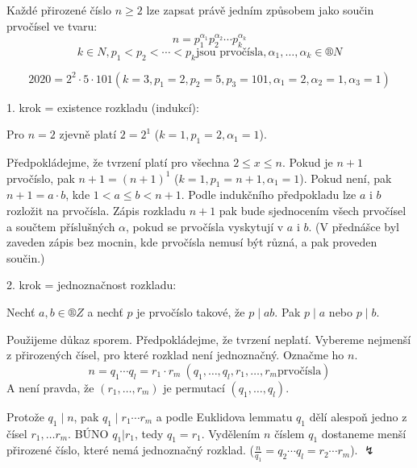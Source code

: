 \documentclass[12pt]{article}					%
\begin{document}
    \begin{veta}
        Každé přirozené číslo $n≥2$ lze zapsat právě jedním způsobem jako součin prvočísel ve tvaru:
        $$ n = p_1^{\alpha_1}p_2^{\alpha_2}\cdots p_k^{\alpha_k} $$ 
        $$ k \in N, p_1<p_2<\cdots<p_k \text{jsou prvočísla}, \alpha_1,…,\alpha_k \in ®N$$
        \begin{prikladyin}
                $$ 2020 = 2^2 \cdot 5 \cdot 101 (k = 3, p_1 = 2, p_2 = 5, p_3 = 101, \alpha_1 = 2, \alpha_2 = 1, \alpha_3 = 1) $$ 
        \end{prikladyin}
        \begin{dukazin}
            1. krok = existence rozkladu (indukcí):
            
            Pro $n = 2$ zjevně platí $2 = 2^1$ ($k = 1, p_1 = 2, \alpha_1 = 1$).

            Předpokládejme, že tvrzení platí pro všechna $2≤x≤n$. Pokud je $n+1$ prvočíslo, pak $n+1 = (n+1)^1$ ($ k = 1, p_1 = n+1, \alpha_1 = 1$). Pokud není, pak $n+1 = a\cdot b$, kde $1 < a ≤ b < n+1$. Podle indukčního předpokladu lze $a$ i $b$ rozložit na prvočísla. Zápis rozkladu $n+1$ pak bude sjednocením všech prvočísel a součtem příslušných $\alpha$, pokud se prvočísla vyskytují v $a$ i $b$. (V přednášce byl zaveden zápis bez mocnin, kde prvočísla nemusí být různá, a pak proveden součin.)

            2. krok = jednoznačnost rozkladu:

            \begin{lemmain}
                Nechť $a, b \in ®Z$ a nechť $p$ je prvočíslo takové, že $p\mid ab$. Pak $p\mid a$ nebo $p\mid b$.
            \end{lemmain}

            Použijeme důkaz sporem. Předpokládejme, že tvrzení neplatí. Vybereme nejmenší z přirozených čísel, pro které rozklad není jednoznačný. Označme ho $n$.
            $$ n = q_1\cdots q_l = r_1 \cdot r_m\ (q_1,…,q_l,r_1,…,r_m \text{prvočísla}) $$
            A není pravda, že $(r_1,…,r_m)$ je permutací $(q_1,…,q_l)$.

            Protože $q_1\mid n$, pak $q_1 \mid r_1 \cdots r_m$ a podle Euklidova lemmatu $q_1$ dělí alespoň jedno z čísel $r_1,…r_m$. BÚNO $q_1 | r_1$, tedy $q_1 = r_1$. Vydělením $n$ číslem $q_1$ dostaneme menší přirozené číslo, které nemá jednoznačný rozklad. ($\frac{n}{q_1} = q_2\cdots q_l = r_2 \cdots r_m$). $\lightning$
        \end{dukazin}
    \end{veta}
\end{document}
